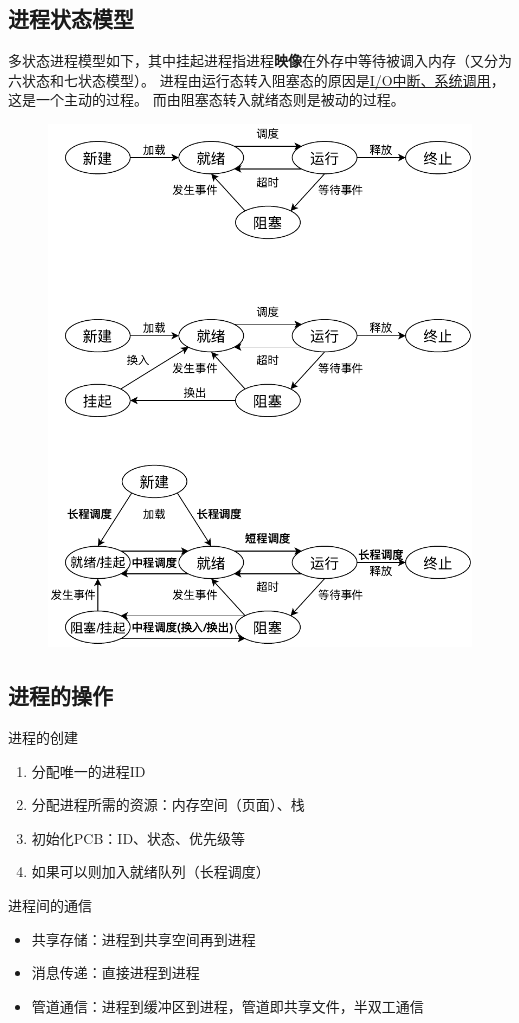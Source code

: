 \subsection{进程状态模型}
多状态进程模型如下，其中挂起进程指进程\textbf{映像}在外存中等待被调入内存（又分为六状态和七状态模型）。
进程由运行态转入阻塞态的原因是\underline{I/O中断、系统调用}，这是一个主动的过程。
而由阻塞态转入就绪态则是被动的过程。
\begin{figure}[H]
	\centering
	\includegraphics[width=0.6\linewidth]{fig/OS.pdf}
\end{figure}

\subsection{进程的操作}
进程的创建
\begin{enumerate}
	\item 分配唯一的进程ID
	\item 分配进程所需的资源：内存空间（页面）、栈
	\item 初始化PCB：ID、状态、优先级等
	\item 如果可以则加入就绪队列（长程调度）
\end{enumerate}

进程间的通信
\begin{itemize}
	\item 共享存储：进程到共享空间再到进程
	\item 消息传递：直接进程到进程
	\item 管道通信：进程到缓冲区到进程，管道即共享文件，半双工通信
\end{itemize}

